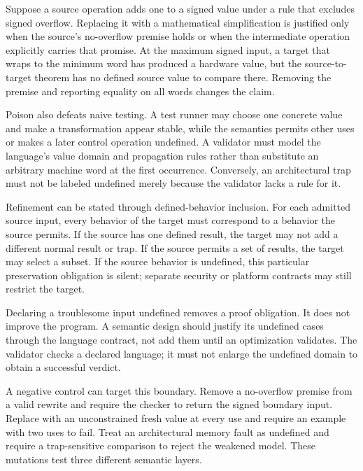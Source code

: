 \begin{example}[title={A premise is part of the optimization}]
Suppose a source operation adds one to a signed value under a rule that excludes
signed overflow. Replacing it with a mathematical simplification is justified
only when the source's no-overflow premise holds or when the intermediate
operation explicitly carries that promise. At the maximum signed input, a
target that wraps to the minimum word has produced a hardware value, but the
source-to-target theorem has no defined source value to compare there. Removing
the premise and reporting equality on all words changes the claim.
\end{example}

Poison also defeats naive testing. A test runner may choose one concrete value
and make a transformation appear stable, while the semantics permits other
uses or makes a later control operation undefined. A validator must model the
language's value domain and propagation rules rather than substitute an
arbitrary machine word at the first occurrence. Conversely, an architectural
trap must not be labeled undefined merely because the validator lacks a rule
for it.

Refinement can be stated through defined-behavior inclusion. For each admitted
source input, every behavior of the target must correspond to a behavior the
source permits. If the source has one defined result, the target may not add a
different normal result or trap. If the source permits a set of results, the
target may select a subset. If the source behavior is undefined, this particular
preservation obligation is silent; separate security or platform contracts may
still restrict the target.

\begin{warning}[title={More undefined behavior makes a theorem easier and a language weaker}]
Declaring a troublesome input undefined removes a proof obligation. It does
not improve the program. A semantic design should justify its undefined cases
through the language contract, not add them until an optimization validates.
The validator checks a declared language; it must not enlarge the undefined
domain to obtain a successful verdict.
\end{warning}

A negative control can target this boundary. Remove a no-overflow premise from
a valid rewrite and require the checker to return the signed boundary input.
Replace  with an unconstrained fresh value at every use and require
an example with two uses to fail. Treat an architectural memory fault as
undefined and require a trap-sensitive comparison to reject the weakened
model. These mutations test three different semantic layers.

